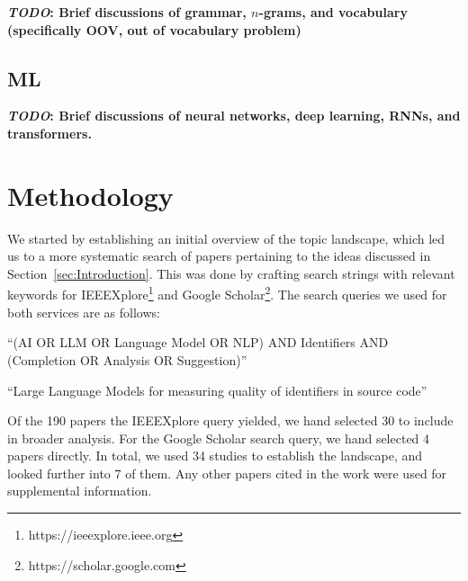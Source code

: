 \documentclass[conference]{IEEEtran}
\newcommand{\TODO}[1]{\textbf{\textcolor{Bittersweet}{#1}}\xspace}
\newcommand{\TODOM}[1]{\TODO{\emph{TODO}: #1}\xspace}
\begin{document}
\TODOM{Brief discussions of grammar, $n$-grams, and vocabulary (specifically %
       OOV, out of vocabulary problem)}

\subsection{\acl{ML}}
\label{ssec:Machine-Learning}

\TODOM{Brief discussions of neural networks, deep learning, RNNs, and transformers.}



\section{Methodology}
\label{sec:Methodology}

We started by establishing an initial overview of the topic landscape, which led us to a
more systematic search of papers pertaining to the ideas discussed in
Section~\ref{sec:Introduction}. This was done by crafting search strings with relevant
keywords for IEEEXplore\footnote{https://ieeexplore.ieee.org} and Google
Scholar\footnote{https://scholar.google.com}. The search queries we used for both services
are as follows:

\begin{description}
    \item[IEEEXplore:]

    \enquote{(AI OR LLM OR Language Model OR NLP) AND Identifiers AND %
             (Completion OR Analysis OR Suggestion)}

    \item[Google Scholar:]

    \enquote{Large Language Models for measuring quality of identifiers in source code}
\end{description}

Of the 190 papers the IEEEXplore query yielded, we hand selected 30 to include in broader
analysis. For the Google Scholar search query, we hand selected 4 papers directly. In
total, we used 34 studies to establish the landscape, and looked further into 7 of them.
Any other papers cited in the work were used for supplemental information.

\end{document}
